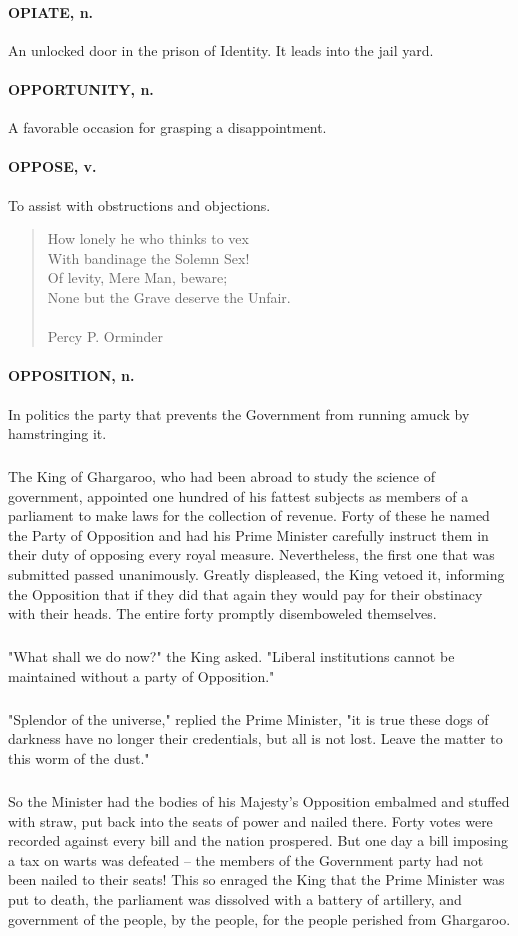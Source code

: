 \documentclass[11pt]{article}
\begin{document}
\paragraph{OPIATE, n.}  An unlocked door in the prison of Identity.  It leads into
the jail yard.

\paragraph{OPPORTUNITY, n.}  A favorable occasion for grasping a disappointment.

\paragraph{OPPOSE, v.}  To assist with obstructions and objections.

\begin{quote}   How lonely he who thinks to vex \\
  With bandinage the Solemn Sex! \\
  Of levity, Mere Man, beware; \\
  None but the Grave deserve the Unfair. \\
 \\
Percy P. Orminder \end{quote}


\paragraph{OPPOSITION, n.}  In politics the party that prevents the Government from
running amuck by hamstringing it.
\subparagraph{}   The King of Ghargaroo, who had been abroad to study the science of
government, appointed one hundred of his fattest subjects as members
of a parliament to make laws for the collection of revenue.  Forty of
these he named the Party of Opposition and had his Prime Minister
carefully instruct them in their duty of opposing every royal measure.
Nevertheless, the first one that was submitted passed unanimously.
Greatly displeased, the King vetoed it, informing the Opposition that
if they did that again they would pay for their obstinacy with their
heads.  The entire forty promptly disemboweled themselves.
\subparagraph{}   "What shall we do now?" the King asked.  "Liberal institutions
cannot be maintained without a party of Opposition."
\subparagraph{}   "Splendor of the universe," replied the Prime Minister, "it is
true these dogs of darkness have no longer their credentials, but all
is not lost.  Leave the matter to this worm of the dust."
\subparagraph{}   So the Minister had the bodies of his Majesty's Opposition 
embalmed and stuffed with straw, put back into the seats of power and 
nailed there.  Forty votes were recorded against every bill and the
nation prospered.  But one day a bill imposing a tax on warts was
defeated -- the members of the Government party had not been nailed to
their seats!  This so enraged the King that the Prime Minister was put
to death, the parliament was dissolved with a battery of artillery,
and government of the people, by the people, for the people perished
from Ghargaroo.
\end{document}
